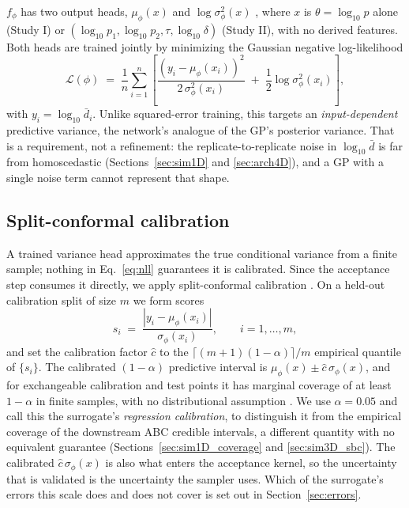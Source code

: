 \documentclass[sn-basic,iicol,pdflatex]{sn-jnl}
\newcommand{\dbar}{\ensuremath{\bar d}}
\begin{document}
$f_\phi$ has two output heads, $\mu_\phi(x)$ and $\log\sigma^2_\phi(x)$ \citep{nix1994}, where
$x$ is $\theta=\log_{10}p$ alone (Study I) or $(\log_{10}p_1, \log_{10}p_2,
\tau, \log_{10}\delta)$ (Study II), with no derived features. Both heads are trained jointly by
minimizing the Gaussian negative log-likelihood
\begin{equation}
\label{eq:nll}
\mathcal{L}(\phi) \;=\; \frac{1}{n}\sum_{i=1}^n \left[
\frac{\left(y_i - \mu_\phi(x_i)\right)^2}{2\,\sigma_\phi^2(x_i)}
\;+\; \frac{1}{2}\log \sigma_\phi^2(x_i)
\right],
\end{equation}
with $y_i = \log_{10}\dbar_i$. Unlike squared-error training, this targets an
\emph{input-dependent} predictive variance, the network's analogue of the GP's
posterior variance. That is a requirement, not a refinement: the
replicate-to-replicate noise in $\log_{10}\dbar$ is far from homoscedastic
(Sections~\ref{sec:sim1D} and \ref{sec:arch4D}), and a GP with a single noise
term cannot represent that shape.

\subsection{Split-conformal calibration}
\label{sec:conformal}

A trained variance head approximates the true conditional variance from a
finite sample; nothing in Eq.~\eqref{eq:nll} guarantees it is calibrated. Since
the acceptance step consumes it directly, we apply split-conformal calibration
\citep{lei2018,vovk2022,angelopoulos2023}. On a held-out calibration split of size $m$ we form scores
\[
s_i \;=\; \frac{\left|y_i - \mu_\phi(x_i)\right|}{\sigma_\phi(x_i)}, \qquad i=1,\dots,m,
\]
and set the calibration factor $\hat c$ to the $\lceil (m+1)(1-\alpha)
\rceil / m$ empirical quantile of $\{s_i\}$. The calibrated $(1-\alpha)$
predictive interval is $\mu_\phi(x) \pm \hat c\, \sigma_\phi(x)$, and for
exchangeable calibration and test points it has marginal coverage of at least
$1-\alpha$ in finite samples, with no distributional assumption \citep{lei2018}.
We use $\alpha = 0.05$ and call this the surrogate's \emph{regression
calibration}, to distinguish it from the empirical coverage of the downstream
ABC credible intervals, a different quantity with no equivalent guarantee
(Sections~\ref{sec:sim1D_coverage} and \ref{sec:sim3D_sbc}). The calibrated
$\hat c\,\sigma_\phi(x)$ is also what enters the acceptance kernel, so the
uncertainty that is validated is the uncertainty the sampler uses. Which of the surrogate's errors this scale does and does not cover is set out in Section~\ref{sec:errors}.
\end{document}
